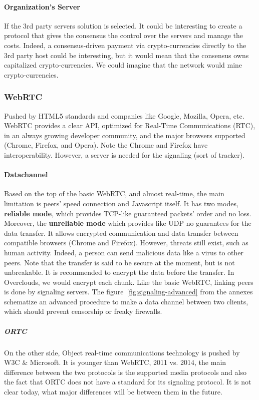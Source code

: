 \paragraph{Organization's Server} If the 3rd party servers solution is selected. It could be interesting to create a protocol that gives the consensus the control over the servers and manage the costs. Indeed, a consensus-driven payment via crypto-currencies directly to the 3rd party host could be interesting, but it would mean that the consensus owns capitalized crypto-currencies. We could imagine that the network would mine crypto-currencies.

\subsubsection{WebRTC}
Pushed by HTML5 standards and companies like Google, Mozilla, Opera, etc. WebRTC\cite{GoogleWebRTC} provides a clear API, optimized for Real-Time Communications (RTC), in an always growing developer community, and the major browsers supported (Chrome, Firefox, and Opera). Note the Chrome and Firefox have interoperability. However, a server is needed for the signaling (sort of tracker).

\paragraph{Datachannel\cite{R.Stewart2007StreamProtocol}} Based on the top of the basic WebRTC, and almost real-time,  the main limitation is peers' speed connection and Javascript itself. It has two modes, \textbf{reliable mode}, which provides TCP-like guaranteed packets' order and no loss. Moreover, the \textbf{unreliable mode} which provides like UDP no guarantees for the data transfer. It allows encrypted communication and data transfer between compatible browsers (Chrome and Firefox). However, threats still exist, such as human activity. Indeed, a person can send malicious data like a virus to other peers. Note that the transfer is said to be secure at the moment, but is not unbreakable. It is recommended to encrypt the data before the transfer. In Overclouds, we would encrypt each chunk. Like the basic WebRTC, linking peers is done by signaling servers. The figure~\ref{fig:signaling-advanced} from the annexes schematize an advanced procedure to make a data channel between two clients, which should prevent censorship or freaky firewalls.

\subparagraph{ORTC} On the other side, Object real-time communications technology is pushed by W3C \& Microsoft. It is younger than WebRTC, 2011 vs. 2014, the main difference\cite{Sinch2015ORTCDIFFERENCE} between the two protocols is the supported media protocols and also the fact that ORTC does not have a standard for its signaling protocol. It is not clear today, what major differences will be between them in the future.

